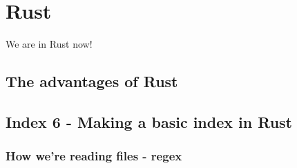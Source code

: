 \documentclass[../../main.tex]{subfiles}
\begin{document}
\chapter{Rust}

We are in Rust now!

\section{The advantages of Rust}

\section{Index 6 - Making a basic index in Rust}

\subsection{How we're reading files - regex}
\end{document}
